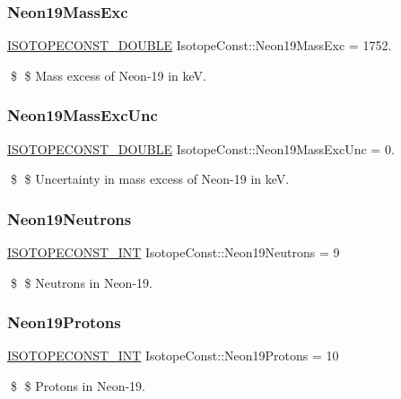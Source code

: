 \subsubsection{\texorpdfstring{Neon19\+Mass\+Exc}{Neon19MassExc}}
{\footnotesize\ttfamily \mbox{\hyperlink{group___isotope_const-_macros_ga8f45a7272ce02c0b4c65c44636ed719a}{I\+S\+O\+T\+O\+P\+E\+C\+O\+N\+S\+T\+\_\+\+D\+O\+U\+B\+LE}} Isotope\+Const\+::\+Neon19\+Mass\+Exc = 1752.}

\$ \$ Mass excess of Neon-\/19 in keV. \mbox{\label{group___isotope_const-_neon-_ne19_ga83c75688110fd7fdb7c47f9ae8ba69c4}} 
\subsubsection{\texorpdfstring{Neon19\+Mass\+Exc\+Unc}{Neon19MassExcUnc}}
{\footnotesize\ttfamily \mbox{\hyperlink{group___isotope_const-_macros_ga8f45a7272ce02c0b4c65c44636ed719a}{I\+S\+O\+T\+O\+P\+E\+C\+O\+N\+S\+T\+\_\+\+D\+O\+U\+B\+LE}} Isotope\+Const\+::\+Neon19\+Mass\+Exc\+Unc = 0.}

\$ \$ Uncertainty in mass excess of Neon-\/19 in keV. \mbox{\label{group___isotope_const-_neon-_ne19_ga9bdd299750a63ff438fdfae1996cfcd2}} 
\subsubsection{\texorpdfstring{Neon19\+Neutrons}{Neon19Neutrons}}
{\footnotesize\ttfamily \mbox{\hyperlink{group___isotope_const-_macros_ga5f18360b3e99483a35c32d789e62621c}{I\+S\+O\+T\+O\+P\+E\+C\+O\+N\+S\+T\+\_\+\+I\+NT}} Isotope\+Const\+::\+Neon19\+Neutrons = 9}

\$ \$ Neutrons in Neon-\/19. \mbox{\label{group___isotope_const-_neon-_ne19_ga5f6a3c030c2350a2eb088fbf3e5fc36c}} 
\subsubsection{\texorpdfstring{Neon19\+Protons}{Neon19Protons}}
{\footnotesize\ttfamily \mbox{\hyperlink{group___isotope_const-_macros_ga5f18360b3e99483a35c32d789e62621c}{I\+S\+O\+T\+O\+P\+E\+C\+O\+N\+S\+T\+\_\+\+I\+NT}} Isotope\+Const\+::\+Neon19\+Protons = 10}

\$ \$ Protons in Neon-\/19. 